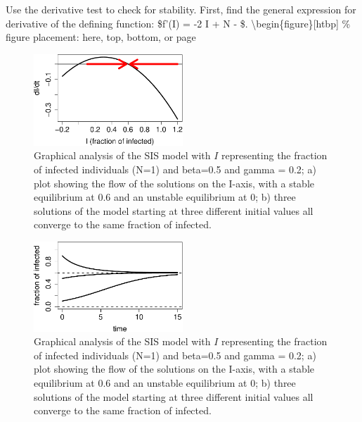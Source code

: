 \documentclass[
  letterpaper,
  DIV=11,
  numbers=noendperiod]{scrreprt}
\begin{document}
Use the derivative test to check for stability. First, find the general
expression for derivative of the defining function: \$f'(I) = -2 \beta I
+ \beta N - \gamma \$. \textbackslash begin\{figure\}{[}htbp{]} \%
figure placement: here, top, bottom, or page

\begin{figure}

{\centering \includegraphics[width=0.5\textwidth,height=\textheight]{./graph_odes_files/figure-pdf/ch7-flow-sis1-1.pdf}

}

\caption{Graphical analysis of the SIS model with \(I\) representing the
fraction of infected individuals (N=1) and beta=0.5 and gamma = 0.2; a)
plot showing the flow of the solutions on the I-axis, with a stable
equilibrium at 0.6 and an unstable equilibrium at 0; b) three solutions
of the model starting at three different initial values all converge to
the same fraction of infected.}

\end{figure}

\begin{figure}

{\centering \includegraphics[width=0.5\textwidth,height=\textheight]{./graph_odes_files/figure-pdf/ch7-flow-sis1-2.pdf}

}

\caption{Graphical analysis of the SIS model with \(I\) representing the
fraction of infected individuals (N=1) and beta=0.5 and gamma = 0.2; a)
plot showing the flow of the solutions on the I-axis, with a stable
equilibrium at 0.6 and an unstable equilibrium at 0; b) three solutions
of the model starting at three different initial values all converge to
the same fraction of infected.}

\end{figure}
\end{document}
